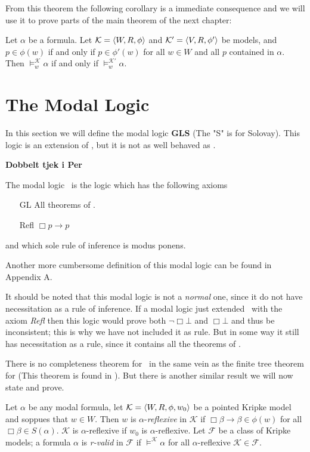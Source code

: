 \documentclass[../main.tex]{subfiles}
\begin{document}
From this theorem the following corollary is a immediate consequence and we
will use it to prove parts of the main theorem of the next chapter:
\begin{cor}\label{cor:conti}
	Let $\alpha$ be a formula. Let $\mathcal{K}=\langle W,R,\phi\rangle$ and
	$\mathcal{K}'=\langle V,R,\phi'\rangle$ be models, and $p\in\phi(w)$ if and
	only if $p\in\phi'(w)$ for all $w\in W$ and all $p$ contained in
	$\alpha$.
	Then $\vDash_w^\mathcal{K}\alpha$ if and only if
	$\vDash_w^{\mathcal{K}'}\alpha$.
\end{cor}

\section{The Modal Logic }

In this section we will define the modal logic \textbf{GLS} (The "S" is for
Solovay). This logic is an extension of \GL, but it is not as well behaved as
\GL.

\begin{defi}
	\textbf{Dobbelt tjek i Per}

	The modal logic \GLS\ is the logic which has the following axioms 
	\begin{enumerate}
		\item[GL] All theorems of \GL.
		\item[Refl] $\Box p\rightarrow p $
	\end{enumerate}
	and which sole rule of inference is modus ponens.
\end{defi}

Another more cumbersome definition of this modal logic can be found in
Appendix A.

It should be noted that this modal logic is not a \textit{normal} one, since it
do not have  necessitation as a rule of inference. If a modal logic just extended
\GL\ with the axiom \textit{Refl} then this logic would prove both
$\neg\Box\bot$ and $\Box\bot$ and thus be inconsistent; this is why we have not
included it as rule. But in some way it still has necessitation as a rule,
since it contains all the theorems of \GL.

There is no completeness theorem for \GLS\ in the same vein as the finite tree
theorem for \GL (This theorem is found in \parencite{Lind1997}). But there is another similar result we will now state and
prove.
\begin{defi}
	Let $\alpha$ be any modal formula, let $\mathcal{K}=\langle
W,R,\phi,w_0\rangle$ be a pointed Kripke model and soppues that $w\in W$.
Then $w$ is $\alpha$-\textit{reflexive} in $\mathcal{K}$ if
$\Box\beta\rightarrow\beta\in\phi(w)$ for all $\Box\beta\in S(\alpha)$.
$\mathcal{K}$ is $\alpha$-reflexive if $w_0$ is $\alpha$-reflexive. Let
$\mathcal{F}$ be a class of Kripke models; a formula $\alpha$ is
\textit{r-valid} in $\mathcal{F}$ if $\vDash^\mathcal{K}\alpha$ for all
$\alpha$-reflexive $\mathcal{K}\in\mathcal{F}$.
\end{defi}
\end{document}

